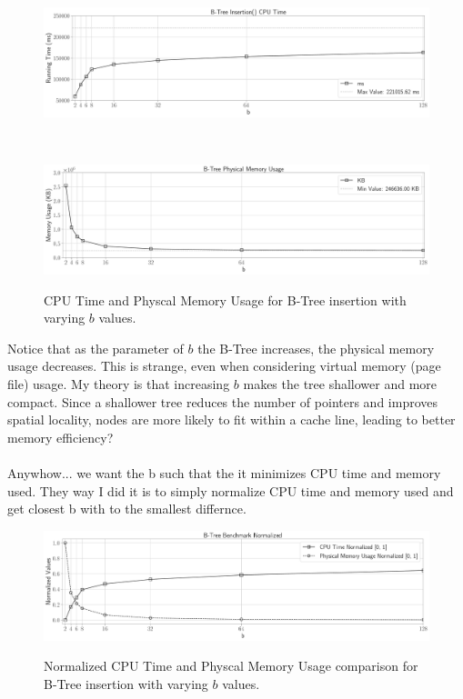 \documentclass[12pt]{article}
\begin{document}
\begin{figure}[H]
	\centering
	\begin{minipage}{1\textwidth}
		\centering
		\includegraphics[width=\linewidth]{../notebook/b-tree_insertion()_cpu_time.pdf}
		\label{fig:cpu_time}
	\end{minipage}\hfill
	\\
	\begin{minipage}{1\textwidth}
		\centering
		\includegraphics[width=\linewidth]{../notebook/b-tree_physical_memory_usage.pdf}
		\label{fig:physical_memory}
	\end{minipage}\hfill
	\caption{CPU Time and Physcal Memory Usage for B-Tree insertion with varying $b$ values.}
\end{figure}

Notice that as the parameter of $b$ the B-Tree increases, the physical memory usage decreases. This is strange, even when considering virtual memory (page file) usage. My theory is that increasing $b$ makes the tree shallower and more compact. Since a shallower tree reduces the number of pointers and improves spatial locality, nodes are more likely to fit within a cache line, leading to better memory efficiency?
\\\\
Anywhow... we want the b such that the it minimizes CPU time and memory used. They way I did it is to simply normalize CPU time and memory used and get closest b with to the smallest differnce. 

\begin{figure}[H]
	\centering
	\begin{minipage}{1\textwidth}
		\centering
		\includegraphics[width=\linewidth]{../notebook/b-tree_benchmark_normalized.pdf}
		\label{fig:benchmark_normalized}
	\end{minipage}
	\caption{Normalized CPU Time and Physcal Memory Usage comparison for B-Tree insertion with varying $b$ values.}
\end{figure}
\end{document}
